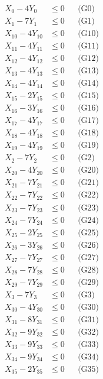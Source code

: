 \documentclass[a4paper,10pt]{article}
\begin{document}
\allowdisplaybreaks
{\small\begin{align}
X_{0} - 4Y_{0} &\leq 0 && \text{(G0)} \\
X_{1} - 7Y_{1} &\leq 0 && \text{(G1)} \\
X_{10} - 4Y_{10} &\leq 0 && \text{(G10)} \\
X_{11} - 4Y_{11} &\leq 0 && \text{(G11)} \\
X_{12} - 4Y_{12} &\leq 0 && \text{(G12)} \\
X_{13} - 4Y_{13} &\leq 0 && \text{(G13)} \\
X_{14} - 4Y_{14} &\leq 0 && \text{(G14)} \\
X_{15} - 2Y_{15} &\leq 0 && \text{(G15)} \\
X_{16} - 3Y_{16} &\leq 0 && \text{(G16)} \\
X_{17} - 4Y_{17} &\leq 0 && \text{(G17)} \\
X_{18} - 4Y_{18} &\leq 0 && \text{(G18)} \\
X_{19} - 4Y_{19} &\leq 0 && \text{(G19)} \\
X_{2} - 7Y_{2} &\leq 0 && \text{(G2)} \\
X_{20} - 4Y_{20} &\leq 0 && \text{(G20)} \\
X_{21} - 7Y_{21} &\leq 0 && \text{(G21)} \\
X_{22} - 7Y_{22} &\leq 0 && \text{(G22)} \\
X_{23} - 7Y_{23} &\leq 0 && \text{(G23)} \\
X_{24} - 7Y_{24} &\leq 0 && \text{(G24)} \\
X_{25} - 2Y_{25} &\leq 0 && \text{(G25)} \\
X_{26} - 3Y_{26} &\leq 0 && \text{(G26)} \\
\allowbreak
X_{27} - 7Y_{27} &\leq 0 && \text{(G27)} \\
X_{28} - 7Y_{28} &\leq 0 && \text{(G28)} \\
X_{29} - 7Y_{29} &\leq 0 && \text{(G29)} \\
X_{3} - 7Y_{3} &\leq 0 && \text{(G3)} \\
X_{30} - 4Y_{30} &\leq 0 && \text{(G30)} \\
X_{31} - 8Y_{31} &\leq 0 && \text{(G31)} \\
X_{32} - 9Y_{32} &\leq 0 && \text{(G32)} \\
X_{33} - 9Y_{33} &\leq 0 && \text{(G33)} \\
X_{34} - 9Y_{34} &\leq 0 && \text{(G34)} \\
X_{35} - 2Y_{35} &\leq 0 && \text{(G35)} \\

\end{align}}
\end{document}

